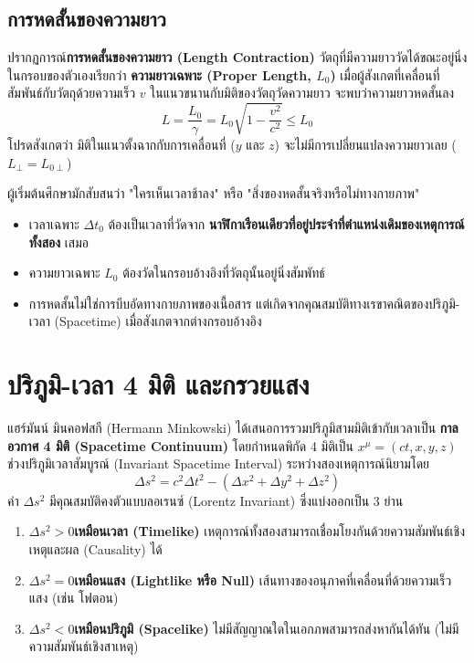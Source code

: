 \subsection{การหดสั้นของความยาว}
ปรากฏการณ์\textbf{การหดสั้นของความยาว (Length Contraction)} วัตถุที่มีความยาววัดได้ขณะอยู่นิ่งในกรอบของตัวเองเรียกว่า \textbf{ความยาวเฉพาะ (Proper Length, $L_0$)} เมื่อผู้สังเกตที่เคลื่อนที่สัมพันธ์กับวัตถุด้วยความเร็ว $v$ ในแนวขนานกับมิติของวัตถุวัดความยาว จะพบว่าความยาวหดสั้นลง
\begin{equation}
L = \frac{L_0}{\gamma} = L_0 \sqrt{1 - \frac{v^2}{c^2}} \le L_0
\end{equation}
โปรดสังเกตว่า มิติในแนวตั้งฉากกับการเคลื่อนที่ ($y$ และ $z$) จะไม่มีการเปลี่ยนแปลงความยาวเลย ($L_\perp = L_{0\perp}$)

\begin{pitfallbox}
ผู้เริ่มต้นศึกษามักสับสนว่า "ใครเห็นเวลาช้าลง" หรือ "สิ่งของหดสั้นจริงหรือไม่ทางกายภาพ"
\begin{itemize}
    \item เวลาเฉพาะ $\Delta t_0$ ต้องเป็นเวลาที่วัดจาก \textbf{นาฬิกาเรือนเดียวที่อยู่ประจำที่ตำแหน่งเดิมของเหตุการณ์ทั้งสอง} เสมอ
    \item ความยาวเฉพาะ $L_0$ ต้องวัดในกรอบอ้างอิงที่วัตถุนั้นอยู่นิ่งสัมพัทธ์
    \item การหดสั้นไม่ใช่การบีบอัดทางกายภาพของเนื้อสาร แต่เกิดจากคุณสมบัติทางเรขาคณิตของปริภูมิ-เวลา (Spacetime) เมื่อสังเกตจากต่างกรอบอ้างอิง
\end{itemize}
\end{pitfallbox}

\section{ปริภูมิ-เวลา 4 มิติ และกรวยแสง}

แฮร์มันน์ มินคอฟสกี (Hermann Minkowski) ได้เสนอการรวมปริภูมิสามมิติเข้ากับเวลาเป็น \textbf{กาลอวกาศ 4 มิติ (Spacetime Continuum)} โดยกำหนดพิกัด 4 มิติเป็น $x^\mu = (ct, x, y, z)$ ช่วงปริภูมิเวลาสัมบูรณ์ (Invariant Spacetime Interval) ระหว่างสองเหตุการณ์นิยามโดย
\begin{equation}
\Delta s^2 = c^2 \Delta t^2 - \left( \Delta x^2 + \Delta y^2 + \Delta z^2 \right)
\end{equation}
ค่า $\Delta s^2$ มีคุณสมบัติคงตัวแบบลอเรนซ์ (Lorentz Invariant) ซึ่งแบ่งออกเป็น 3 ย่าน
\begin{enumerate}
    \item $\Delta s^2 > 0$\quad \textbf{เหมือนเวลา (Timelike)} เหตุการณ์ทั้งสองสามารถเชื่อมโยงกันด้วยความสัมพันธ์เชิงเหตุและผล (Causality) ได้
    \item $\Delta s^2 = 0$\quad \textbf{เหมือนแสง (Lightlike หรือ Null)} เส้นทางของอนุภาคที่เคลื่อนที่ด้วยความเร็วแสง (เช่น โฟตอน)
    \item $\Delta s^2 < 0$\quad \textbf{เหมือนปริภูมิ (Spacelike)} ไม่มีสัญญาณใดในเอกภพสามารถส่งหากันได้ทัน (ไม่มีความสัมพันธ์เชิงสาเหตุ)
\end{enumerate}

